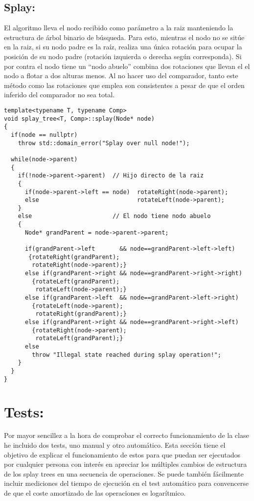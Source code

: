 \documentclass[letterpaper,12pt]{article}
\begin{document}
\subsection{Splay:}

El algoritmo lleva el nodo recibido como parámetro a la raiz manteniendo la
estructura de árbol binario de búsqueda. Para esto, mientras el nodo no se sitúe en la raiz, si su nodo padre es la raíz, realiza una única rotación 
para ocupar la posición de su nodo padre (rotación izquierda o derecha según
corresponda). Si por contra el nodo tiene un ``nodo abuelo'' combina dos 
rotaciones que llevan el el nodo a flotar a dos alturas menos. Al no hacer uso 
del comparador, tanto este método como las rotaciones que emplea son 
consistentes a pesar de que el orden inferido del comparador no sea total.


\begin{lstlisting}
template<typename T, typename Comp>
void splay_tree<T, Comp>::splay(Node* node)
{
  if(node == nullptr)
    throw std::domain_error("Splay over null node!");

  while(node->parent)
  {
    if(!node->parent->parent)  // Hijo directo de la raiz
    {
      if(node->parent->left == node)  rotateRight(node->parent);
      else                            rotateLeft(node->parent);
    }
    else                       // El nodo tiene nodo abuelo
    {
      Node* grandParent = node->parent->parent;

      if(grandParent->left       && node==grandParent->left->left)
       {rotateRight(grandParent);
        rotateRight(node->parent);}
      else if(grandParent->right && node==grandParent->right->right)
        {rotateLeft(grandParent);
         rotateLeft(node->parent);}
      else if(grandParent->left  && node==grandParent->left->right)
        {rotateLeft(node->parent);
         rotateRight(grandParent);}
      else if(grandParent->right && node==grandParent->right->left)
        {rotateRight(node->parent);
         rotateLeft(grandParent);}
      else
        throw "Illegal state reached during splay operation!";
    }
  }
}
\end{lstlisting}

\section{Tests:}
Por mayor sencillez a la hora de comprobar el correcto funcionamiento de la 
clase he incluido dos tests, uno manual y otro automático. Esta sección tiene
el objetivo de explicar el funcionamiento de estos para que puedan ser 
ejecutados por cualquier persona con interés en apreciar los múltiples cambios
de estructura de los splay trees en una secuencia de operaciones. Se puede
también fácilmente incluir mediciones del tiempo de ejecución en el test 
automático para convencerse de que el coste amortizado de las operaciones es 
logarítmico.
\end{document}
